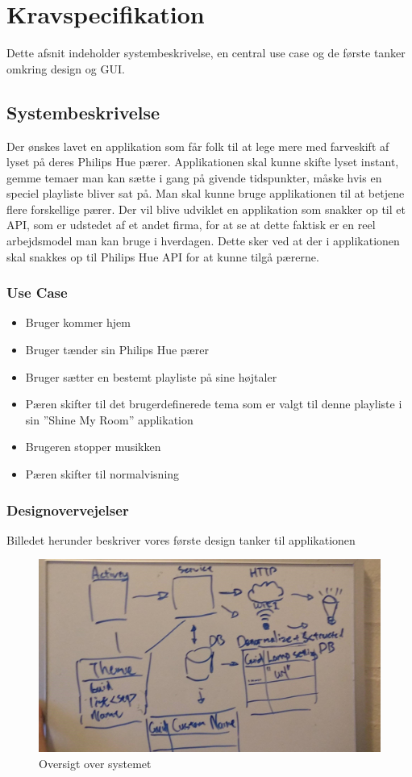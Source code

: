 	\chapter{Kravspecifikation}
	Dette afsnit indeholder systembeskrivelse, en central use case og de første tanker omkring design og GUI. \\
	
		\section{Systembeskrivelse}
		Der ønskes lavet en applikation som får folk til at lege mere med farveskift af lyset på deres Philips Hue pærer.
		Applikationen skal kunne skifte lyset instant, gemme temaer man kan sætte i gang på givende tidspunkter, måske hvis en speciel playliste bliver sat på. Man skal kunne bruge applikationen til at betjene flere forskellige pærer.
		Der vil blive udviklet en applikation som snakker op til et API, som er udstedet af et andet firma, for at se at dette faktisk er en reel arbejdsmodel man kan bruge i hverdagen.
		Dette sker ved at der i applikationen skal snakkes op til Philips Hue API for at kunne tilgå pærerne.
		\newline
		
		\subsection{Use Case}
		\begin{itemize}
			\item Bruger kommer hjem
			\item Bruger tænder sin Philips Hue pærer
			\item Bruger sætter en bestemt playliste på sine højtaler
			\item Pæren skifter til det brugerdefinerede tema som er valgt til denne playliste i sin ”Shine My Room” applikation
			\item Brugeren stopper musikken
			\item Pæren skifter til normalvisning \newline
		\end{itemize}
	
		\subsection{Designovervejelser}
		Billedet herunder beskriver vores første design tanker til applikationen
		\begin{figure}[H]
			\centering
			\includegraphics[width=0.5\linewidth]{Kravspecifikation/Designovervejelser}
			\caption{Oversigt over systemet}
			\label{fig:Designovervejelser}
		\end{figure}
		\newpage
	
